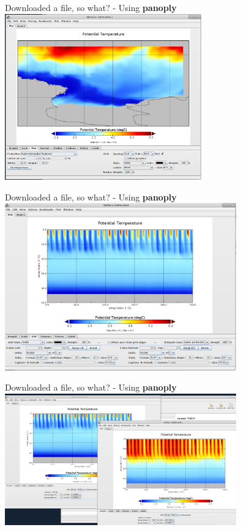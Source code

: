 \begin{frame}{\insertsectionnumber{ |} Downloaded a file, so what? - Using \textbf{panoply}}
    \centering\includegraphics[width=8.5cm]{images/Panoply4.png} \\
\end{frame}


\begin{frame}{\insertsectionnumber{ |} Downloaded a file, so what? - Using \textbf{panoply}}
    \centering\includegraphics[width=10cm]{images/Panoply5.png} \\
\end{frame}


\begin{frame}{\insertsectionnumber{ |} Downloaded a file, so what? - Using \textbf{panoply}}
    \centering\includegraphics[width=10cm]{images/Panoply6.png} \\
\end{frame}


